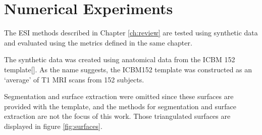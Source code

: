 \chapter{Numerical Experiments}
\label{ch:numeric}

The ESI methods described in Chapter \ref{ch:review} are tested using synthetic data and evaluated using the metrics defined in the same chapter.

The synthetic data was created using anatomical data from the ICBM 152 template[]. 
%
As the name suggests, the ICBM152 template was constructed as an `average' of T1 MRI scans from 152 subjects.

Segmentation and surface extraction were omitted since these surfaces are provided with the template, and the methods for segmentation and surface extraction are not the focus of this work.
%
Those triangulated surfaces are displayed in figure \ref{fig:surfaces}.


